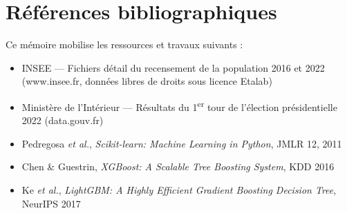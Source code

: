 \chapter{Références bibliographiques}
\label{ann:refs}

Ce mémoire mobilise les ressources et travaux suivants :

\begin{itemize}
  \item INSEE — Fichiers détail du recensement de la population 2016 et 2022
    (www.insee.fr, données libres de droits sous licence Etalab)
  \item Ministère de l'Intérieur — Résultats du 1\textsuperscript{er} tour de
    l'élection présidentielle 2022 (data.gouv.fr)
  \item Pedregosa \textit{et al.}, \textit{Scikit-learn: Machine Learning in Python},
    JMLR 12, 2011
  \item Chen \& Guestrin, \textit{XGBoost: A Scalable Tree Boosting System},
    KDD 2016
  \item Ke \textit{et al.}, \textit{LightGBM: A Highly Efficient Gradient Boosting
    Decision Tree}, NeurIPS 2017
\end{itemize}
